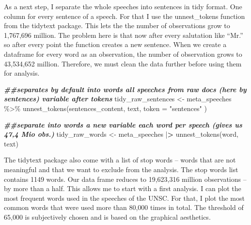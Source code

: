 \documentclass[
]{article}
\newenvironment{Shaded}{\begin{snugshade}}{\end{snugshade}}
\newcommand{\AttributeTok}[1]{\textcolor[rgb]{0.77,0.63,0.00}{#1}}
\newcommand{\CommentTok}[1]{\textcolor[rgb]{0.56,0.35,0.01}{\textit{#1}}}
\newcommand{\DocumentationTok}[1]{\textcolor[rgb]{0.56,0.35,0.01}{\textbf{\textit{#1}}}}
\newcommand{\ErrorTok}[1]{\textcolor[rgb]{0.64,0.00,0.00}{\textbf{#1}}}
\newcommand{\FunctionTok}[1]{\textcolor[rgb]{0.00,0.00,0.00}{#1}}
\newcommand{\NormalTok}[1]{#1}
\newcommand{\OtherTok}[1]{\textcolor[rgb]{0.56,0.35,0.01}{#1}}
\newcommand{\SpecialCharTok}[1]{\textcolor[rgb]{0.00,0.00,0.00}{#1}}
\newcommand{\StringTok}[1]{\textcolor[rgb]{0.31,0.60,0.02}{#1}}
\begin{document}
\begin{Shaded}
\end{Shaded}

As a next step, I separate the whole speeches into sentences in tidy
format. One column for every sentence of a speech. For that I use the
unnest\_tokens function from the tidytext package. This lets the the
number of observations grow to 1,767,696 million. The problem here is
that now after every salutation like ``Mr.'' so after every point the
function creates a new sentence. When we create a dataframe for every
word as an observation, the number of observation grows to 43,534,652
million. Therefore, we must clean the data further before using them for
analysis.

\begin{Shaded}
\begin{Highlighting}[]
\DocumentationTok{\#\#separates by default into words all speeches from raw docs (here by sentences) variable after tokens}
\NormalTok{tidy\_raw\_sentences }\OtherTok{\textless{}{-}}\NormalTok{ meta\_speeches }\SpecialCharTok{\%\textgreater{}\%}
  \FunctionTok{unnest\_tokens}\NormalTok{(sentences\_content, text, }\AttributeTok{token =} \StringTok{"sentences"}\NormalTok{ )}

\DocumentationTok{\#\#separate into words a new variable each word per speech (gives us 47,4 Mio obs.)}
\NormalTok{tidy\_raw\_words }\OtherTok{\textless{}{-}}\NormalTok{ meta\_speeches }\SpecialCharTok{|}\ErrorTok{\textgreater{}} 
    \FunctionTok{unnest\_tokens}\NormalTok{(word, text)}
\end{Highlighting}
\end{Shaded}

The tidytext package also come with a list of stop words -- words that
are not meaningful and that we want to exclude from the analysis. The
stop words list contains 1149 words. Our data frame reduces to
19,623,316 million observations -- by more than a half. This allows me
to start with a first analysis. I can plot the most frequent words used
in the speeches of the UNSC. For that, I plot the most common words that
were used more than 80,000 times in total. The threshold of 65,000 is
subjectively chosen and is based on the graphical aesthetics.
\end{document}
